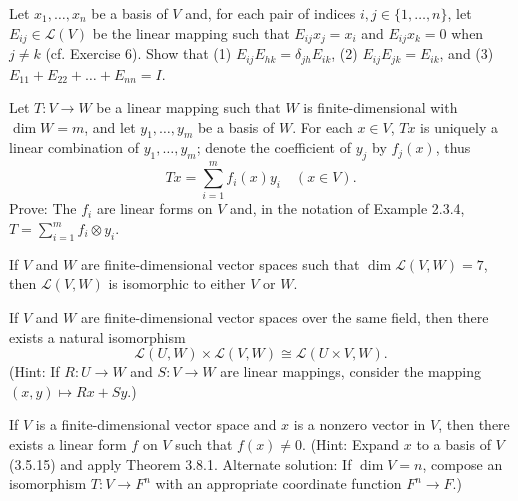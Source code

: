 \newpage
\begin{tcolorbox}[title=Exercise 8, breakable]
    Let $x_1, \ldots, x_n$ be a basis of $V$ and, for each pair of indices 
    $i, j \in \{1, \ldots, n\}$, let $E_{ij} \in \mathcal{L}(V)$ be the linear mapping such that 
    $E_{ij} x_j = x_i$ and $E_{ij} x_k = 0$ when $j \ne k$ (cf. Exercise 6). Show that 
    (1) $E_{ij} E_{hk} = \delta_{jh} E_{ik}$, (2) $E_{ij} E_{jk} = E_{ik}$, and 
    (3) $E_{11} + E_{22} + \ldots + E_{nn} = I$.
\end{tcolorbox}

\begin{tcolorbox}[title=Exercise 9, breakable]
    Let $T : V \to W$ be a linear mapping such that $W$ is finite-dimensional 
    with $\dim W = m$, and let $y_1, \ldots, y_m$ be a basis of $W$. For each 
    $x \in V$, $Tx$ is uniquely a linear combination of $y_1, \ldots, y_m$; denote 
    the coefficient of $y_j$ by $f_j(x)$, thus
    \[Tx = \sum_{i=1}^m f_i(x) y_i \quad (x \in V).\]
    Prove: The $f_i$ are linear forms on $V$ and, in the notation of Example 
    2.3.4, $T = \sum_{i=1}^m f_i \otimes y_i$.
\end{tcolorbox}

\begin{tcolorbox}[title=Exercise 10, breakable]
    If $V$ and $W$ are finite-dimensional vector spaces such that 
    $\dim \mathcal{L}(V, W) = 7$, then $\mathcal{L}(V, W)$ is isomorphic to either $V$ or $W$.
\end{tcolorbox}

\begin{tcolorbox}[title=Exercise 11, breakable]
    If $V$ and $W$ are finite-dimensional vector spaces over the same field, then 
    there exists a natural isomorphism
    \[\mathcal{L}(U, W) \times \mathcal{L}(V, W) \cong \mathcal{L}(U \times V, W).\]
    (Hint: If $R : U \to W$ and $S : V \to W$ are linear mappings, consider 
    the mapping $(x, y) \mapsto Rx + Sy$.)
\end{tcolorbox}

\begin{tcolorbox}[title=Exercise 12, breakable]
    If $V$ is a finite-dimensional vector space and $x$ is a nonzero vector in $V$, 
    then there exists a linear form $f$ on $V$ such that $f(x) \ne 0$. (Hint:
    Expand $x$ to a basis of $V$ (3.5.15) and apply Theorem 3.8.1. Alternate 
    solution: If $\dim V = n$, compose an isomorphism $T : V \to F^n$ with an 
    appropriate coordinate function $F^n \to F$.)
\end{tcolorbox}

